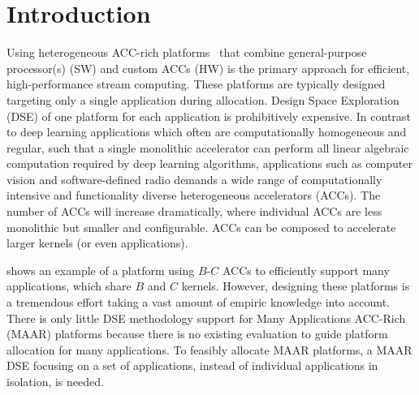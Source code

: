 \vspace{-3pt}
\section{Introduction}
\label{sec:introduction}


Using heterogeneous ACC-rich platforms~\cite{melpignano2012platform} that combine general-purpose processor(s) (SW) and custom ACCs (HW) is the primary approach for efficient, high-performance stream computing.
These platforms are typically designed targeting only a single application during allocation. Design Space Exploration (DSE) of one platform for each application is prohibitively expensive. In contrast to deep learning applications which often are computationally homogeneous and regular, such that a single monolithic accelerator can perform all linear algebraic computation required by deep learning algorithms, applications such as computer vision and software-defined radio demands a wide range of computationally intensive and functionality diverse heterogeneous accelerators (ACCs). The number of ACCs will increase dramatically, where individual ACCs are less monolithic but smaller and configurable. ACCs can be composed to accelerate larger kernels (or even applications).

 shows an example of a platform using $B$-$C$ ACCs to efficiently support many applications, which share $B$ and $C$ kernels. 
However, designing these platforms is a tremendous effort taking a vast amount of empiric knowledge into account. There is only little DSE methodology support for Many Applications ACC-Rich (MAAR) platforms because there is no existing evaluation to guide platform allocation for many applications. To feasibly allocate MAAR platforms, a MAAR DSE focusing on a set of applications, instead of individual applications in isolation, is needed.

